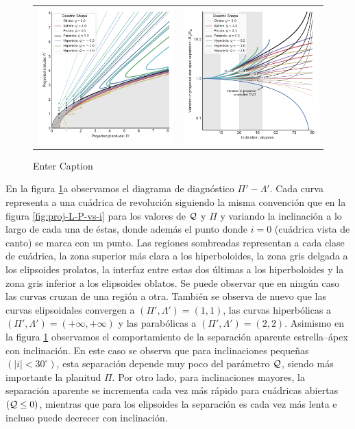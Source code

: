 \begin{figure}
  \begin{tabular}{lr}
    \includegraphics[width=0.5\linewidth]{./Figures/projected-R90-vs-Rc} &
    \includegraphics[width=0.5\linewidth]{./Figures/projected-R0-vs-i}
  \end{tabular}
  \caption{Enter Caption}
  \label{fig:Pip-Lambdap-diagnostic}
\end{figure}

En la figura \ref{fig:Pip-Lambdap-diagnostic}a observamos el diagrama de diagnóstico $\Pi'-\Lambda'$. Cada curva representa a una cuádrica de revolución siguiendo la misma convención que en la figura \ref{fig:proj-L-P-vs-i} para los valores de $\mathcal{Q}$ y $\Pi$ y variando la inclinación a lo largo de cada una de éstas, donde además el punto donde $i=0$ (cuádrica vista de canto) se marca con un punto. Las regiones sombreadas representan a cada clase de cuádrica, la zona superior más clara a los hiperboloides, la zona gris delgada a los elipsoides prolatos, la interfaz entre estas dos últimas a los hiperboloides y la zona gris inferior a los elipsoides oblatos. Se puede observar que en ningún caso las curvas cruzan de una región a otra. También se observa de nuevo que las curvas elipsoidales convergen a $(\Pi', \Lambda') = (1, 1)$, las curvas hiperbólicas a $(\Pi', \Lambda') = (+\infty, +\infty)$ y las parabólicas a $(\Pi', \Lambda') = (2, 2)$. Asimismo en la figura \ref{fig:Pip-Lambdap-diagnostic} observamos el comportamiento de la separación aparente estrella--ápex con inclinación. En este caso se observa que para inclinaciones pequeñas $(|i| < 30^\circ)$, esta separación depende muy poco del parámetro $\mathcal{Q}$, siendo más importante la planitud $\Pi$. Por otro lado, para inclinaciones mayores, la separación aparente se incrementa cada vez más rápido para cuádricas abiertas $(\mathcal{Q} \leq 0)$, mientras que para los elipsoides la separación es cada vez más lenta e incluso puede decrecer con inclinación.

